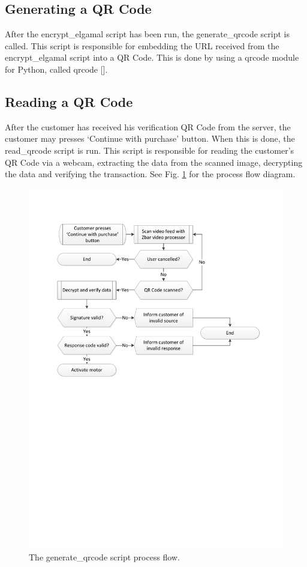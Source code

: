 \subsection{Generating a QR Code}
\label{sec:gen-qrcode}

After the encrypt\_elgamal script has been run, the generate\_qrcode script is
called. This script is responsible for embedding the URL received from the
encrypt\_elgamal script into a QR Code. This is done by using a qrcode module
for Python, called qrcode [\cite{website:qrcode-generator}].

\subsection{Reading a QR Code}

After the customer has received his verification QR Code from the server, the customer
may presses `Continue with purchase' button. When this is done, the read\_qrcode script is
run. This script is responsible for reading the customer's QR Code via a webcam,
extracting the data from the scanned image, decrypting the data and verifying the
transaction. See Fig. \ref{fig:read-qrcode-processflow} for the process flow diagram.

\begin{figure}
 \centering 
 \includegraphics[clip=true, trim = 0 400 50 80, scale=0.75]{read_qrcode_processflow}
 \caption{The generate\_qrcode script process flow.}
 \label{fig:read-qrcode-processflow}
\end{figure}

